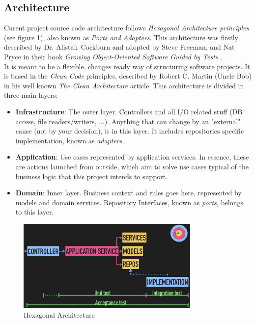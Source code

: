 \subsection{Architecture}

Curent project source code architecture follows \textit{Hexagonal Architecture principles} (see figure \ref{fig:hexarch}), also known as \textit{Ports and Adapters}. This architecture was firstly described by Dr. Alistair Cockburn \cite{cockburn} and adopted by Steve Freeman, and Nat Pryce in their book \textit{Growing Object-Oriented Software Guided by Tests} \cite{growingoos}. \\
It is meant to be a flexible, changes ready way of structuring software projects. It is based in the \textit{Clean Code} principles, described by Robert C. Martin (Uncle Bob) in his well known \textit{The Clean Architecture} \cite{unclebob} article.
\newline
This architecture is divided in three main layers:
\begin{itemize}
    \item \textbf{Infrastructure}: The outer layer. Controllers and all I/O related stuff (DB access, file readers/writers, ...). Anything that can change by an "external" cause (not by your decision), is in this layer. It includes repositories specific implementation, known as \textit{adapters}. 
    \item \textbf{Application}: Use cases represented by application services. In essence, these are actions launched from outside, which aim to solve use cases typical of the business logic that this project intends to support.
    \item \textbf{Domain}: Inner layer. Business context and rules goes here, represented by models and domain services. Repository Interfaces, known as \textit{ports}, belongs to this layer.
\end{itemize}
\newpage

\begin{figure}[H]
	\centering
	\includegraphics[width=0.8\textwidth]{figs/hex_arch_schema.png}
	\caption{Hexagonal Architecture}
	\label{fig:hexarch}
\end{figure}

